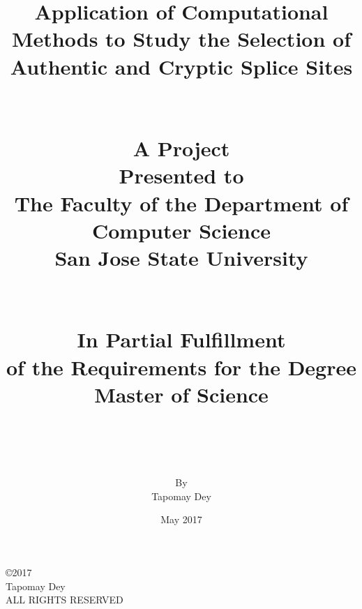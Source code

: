 \documentclass[12pt,a4paper]{article}
\begin{document}
	
	
	\title{
	    {Application of Computational Methods to Study the Selection of Authentic and Cryptic Splice Sites}\\~\\~\\
	    {\large A Project}\\
	    {\large Presented to}\\
	    {\large The Faculty of the Department of Computer Science}\\
	    {\large San Jose State University}\\~\\~\\
	    {\large In Partial Fulfillment}\\
	    {\large of the Requirements for the Degree}\\
	    {\large Master of Science}\\~\\~\\
    }
    
    \author{By\\Tapomay Dey}
    \date{May 2017}
	\maketitle

	\thispagestyle{empty}
	\newpage
	\doublespacing
	\noindent

	\null\vfill
	\noindent
	\begin{center}
	\copyright 2017\\
	Tapomay Dey \\
	ALL RIGHTS RESERVED
	\end{center}
	\newpage	

	\thispagestyle{empty}
	\newpage
	\doublespacing
	\noindent
\end{document}
